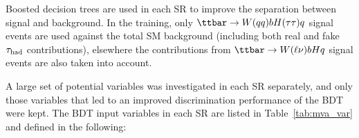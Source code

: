 Boosted decision trees are used in each SR to improve the separation between signal and background. 
In the training, only $\ttbar \to W(qq)bH(\tau\tau)q$ signal events are used against the total SM background (including both real and fake $\tau_{\mathrm{had}}$ contributions), 
elsewhere the contributions from $\ttbar \to W(\ell\nu)bHq$ signal events are also taken into account. 

A large set of potential variables was investigated in each SR separately, and only those variables that led to an improved discrimination
performance of the BDT were kept.  The BDT input variables in each SR are listed in Table~\ref{tab:mva_var} and defined in the following:

